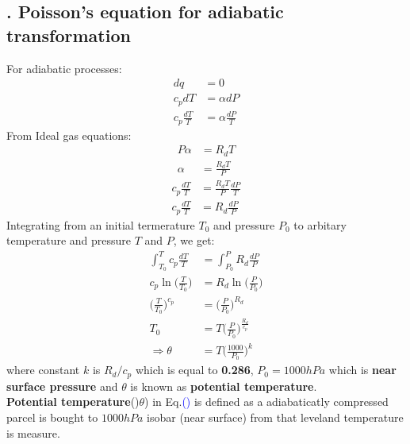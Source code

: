 \documentclass[fleqn,10pt]{SelfArx} %
\newcommand{\myeqref}[1]{\textcolor{blue}{\textup{(\getrefnumber{#1})}}}
\begin{document}
\subsection{. Poisson's equation for adiabatic transformation}
For adiabatic processes:
\begin{align}
    dq &= 0 \\
    c_p dT &= \alpha dP \\
    c_p \frac{dT}{T} &= \alpha \frac{dP}{T}
\end{align}
From Ideal gas equations:
\begin{align}
    P\alpha &= R_dT \\
    \alpha &= \frac{R_d T}{P}
\end{align}
\begin{align}
    c_p \frac{dT}{T} &= \frac{R_d T}{P} \frac{dP}{T} \\
    c_p \frac{dT}{T} &= R_d \frac{dP}{P}
\end{align}
Integrating from an initial termerature $T_0$ and pressure $P_0$ to arbitary temperature and pressure $T$ and $P$, we get:
\begin{align}
    \int^{T}_{T_0} c_p \frac{dT}{T} &= \int^{P}_{P_0} R_d \frac{dP}{P} \\
    c_p \ln\Big(\frac{T}{T_0}\Big) &= R_d  \ln\Big(\frac{P}{P_0}\Big) \\
    \Big(\frac{T}{T_0}\Big)^{c_p} &= \Big(\frac{P}{P_0}\Big)^{R_d} \\
    T_0 &= T\Big(\frac{P}{P_0}\Big)^{\frac{R_d}{c_p}} \\
    \Rightarrow \theta &= T\Big(\frac{1000}{P_0}\Big)^{k} \label{eq:poissonsEq}
\end{align}
where constant $k$ is $R_d/c_p$ which is equal to \textbf{0.286}, $P_0 = 1000 hPa$ which is \textbf{near surface pressure} and $\theta$ is known as \textbf{potential temperature}. \\
\textbf{Potential temperature}()$\theta$) in Eq.\myeqref{eq:poissonsEq} is defined as a adiabaticatly compressed parcel is bought to $1000hPa$ isobar (near surface) from that leveland temperature is measure. \\

\newpage
{}
\end{document}
